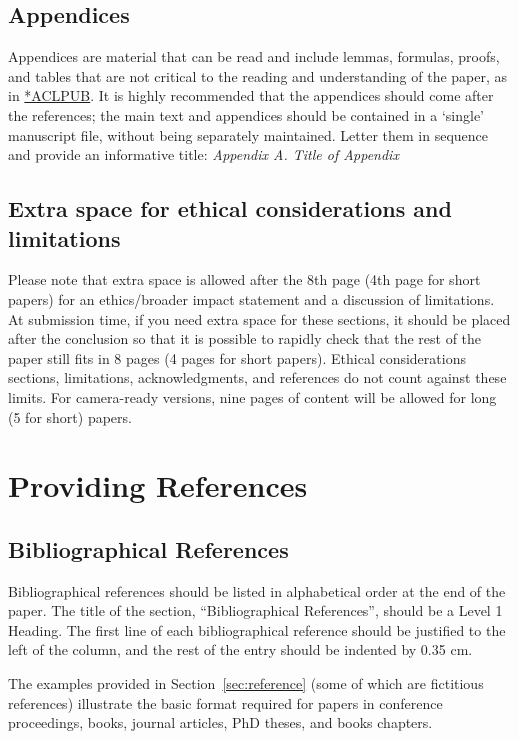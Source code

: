 \documentclass[10pt, a4paper]{article}
\begin{document}
\subsection{Appendices}

Appendices are material that can be read and include lemmas, formulas, proofs, and tables that are not critical to the reading and understanding of the paper, as in \href{https://acl-org.github.io/ACLPUB/formatting.html#appendices}{*ACLPUB}. It is highly recommended that the appendices should come after the references; the main text and appendices should be contained in a `single' manuscript file, without being separately maintained. Letter them in sequence and provide an informative title: \textit{Appendix A. Title of Appendix}


\subsection{Extra space for ethical considerations and limitations}

Please note that extra space is allowed after the 8th page (4th page for short papers) for an ethics/broader impact statement and a discussion of limitations. At submission time, if you need extra space for these sections, it should be placed after the conclusion so that it is possible to rapidly check that the rest of the paper still fits in 8 pages (4 pages for short papers). Ethical considerations sections, limitations, acknowledgments, and references do not count against these limits. For camera-ready versions, nine pages of content will be allowed for long (5 for short)
papers.

\section{Providing References}

\subsection{Bibliographical References} 

Bibliographical references should be listed in alphabetical order at the end of the paper. The title of the section, ``Bibliographical References'', should be a Level 1 Heading. The first line of each bibliographical reference should be justified to the left of the column, and the rest of the entry should be indented by 0.35 cm.

The examples provided in Section~\ref{sec:reference} (some of which are fictitious references) illustrate the basic format required for papers in conference proceedings, books, journal articles, PhD theses, and books chapters.
\end{document}
